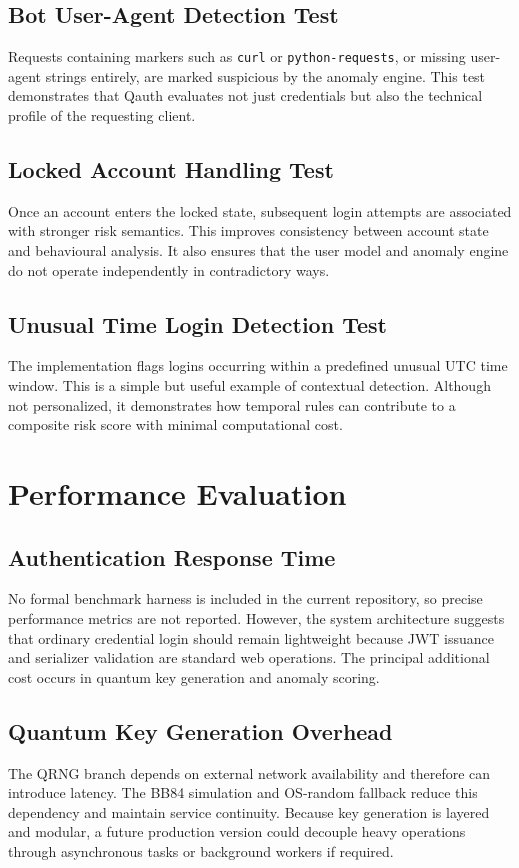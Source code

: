 \subsection{Bot User-Agent Detection Test}
Requests containing markers such as \texttt{curl} or \texttt{python-requests}, or missing user-agent strings entirely, are marked suspicious by the anomaly engine. This test demonstrates that Qauth evaluates not just credentials but also the technical profile of the requesting client.

\subsection{Locked Account Handling Test}
Once an account enters the locked state, subsequent login attempts are associated with stronger risk semantics. This improves consistency between account state and behavioural analysis. It also ensures that the user model and anomaly engine do not operate independently in contradictory ways.

\subsection{Unusual Time Login Detection Test}
The implementation flags logins occurring within a predefined unusual UTC time window. This is a simple but useful example of contextual detection. Although not personalized, it demonstrates how temporal rules can contribute to a composite risk score with minimal computational cost.

\section{Performance Evaluation}

\subsection{Authentication Response Time}
No formal benchmark harness is included in the current repository, so precise performance metrics are not reported. However, the system architecture suggests that ordinary credential login should remain lightweight because JWT issuance and serializer validation are standard web operations. The principal additional cost occurs in quantum key generation and anomaly scoring.

\subsection{Quantum Key Generation Overhead}
The QRNG branch depends on external network availability and therefore can introduce latency. The BB84 simulation and OS-random fallback reduce this dependency and maintain service continuity. Because key generation is layered and modular, a future production version could decouple heavy operations through asynchronous tasks or background workers if required.

